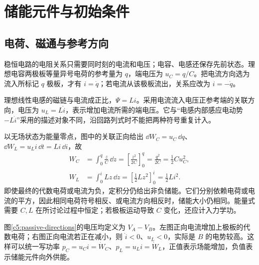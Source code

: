 \section{储能元件与初始条件}
\subsection{电荷、磁通与参考方向}

稳恒电路的电阻关系只需要同时刻的电流和电压；电容、电感还保存先前状态。理想电容两极板等量异号电荷的参考量为 $q$，端电压为 $u_C=q/C$。把电流方向选为流入所标记 $q$ 极板，才有 $i=\dot q$；若电流从该极板流出，关系应改为 $i=-\dot q$。

理想线性电感的磁链与电流成正比，$\Psi=Li$。采用电流流入电压正参考端的关联方向，电压为 $u_L=L\dot i$，表示增加电流所需的端电压。它与“电感内部感应电动势 $-L\dot i$”采用的描述对象不同，沿回路列式时不能把两种符号重复计入。

以无场状态为能量零点，图中的关联正向给出 $\dd W_C=u_C\,\dd q$、$\dd W_L=u_Li\,\dd t=Li\,\dd i$，故
\begin{align*}
W_C&=\int_0^q\frac zC\,\dd z
=\left[\frac{z^2}{2C}\right]_0^q=\frac{q^2}{2C}=\frac12Cu_C^2,\\
W_L&=\int_0^i Lz\,\dd z
=\left[\frac12Lz^2\right]_0^i=\frac12Li^2.
\end{align*}
即使最终的代数电荷或电流为负，定积分仍给出非负储能。它们分别依赖电荷或电流的平方，因此相同电荷符号相反、或电流方向相反时，储能大小仍相同。能量式需要 $C,L$ 在所讨论过程中恒定；若极板运动导致 $C$ 变化，还应计入力学功。

图\ref{c5:passive-directions}的电压均定义为 $V_A-V_B$。左图正向电流增加上极板的代数电荷；右图正向电流若正在减小，则 $\dot i<0$、$u_L<0$，实际是 $B$ 的电势较高。这样可以统一写功率 $p_C=u_Ci=\dot W_C$、$p_L=u_Li=\dot W_L$，正值表示场能增加，负值表示储能元件向外供能。

